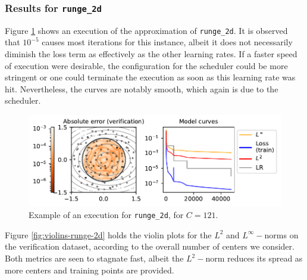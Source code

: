 \documentclass[12pt]{report} %
\begin{document}
\subsubsection*{Results for \texttt{runge\_2d}}

Figure \ref{fig:example-execution-runge-2d} shows an execution of the approximation of \texttt{runge\_2d}. It is observed that $10^{-5}$ causes most iterations for this instance, albeit it does not necessarily diminish the loss term as effectively as the other learning rates. If a faster speed of execution were desirable, the configuration for the scheduler could be more stringent or one could terminate the execution as soon as this learning rate was hit. Nevertheless, the curves are notably smooth, which again is due to the scheduler.

\begin{figure}
  \includegraphics[width=\textwidth]{imagenes/experiments/2d/statistical_2d_full_scheduler_interpolation/runge_2d/runge_2d-TR22-C121-Kgaussian_kernel-Sh2.5635-rrrepetishon-E47252.pdf}
  \caption{Example of an execution for \texttt{runge\_2d}, for $C=121$.}
  \label{fig:example-execution-runge-2d}
\end{figure}

Figure \ref{fig:violins-runge-2d} holds the violin plots for the $L^2$ and $L^\infty-$norms on the verification dataset, according to the overall number of centers we consider. Both metrics are seen to stagnate fast, albeit the $L^2-$norm reduces its spread as more centers and training points are provided.
\end{document}
